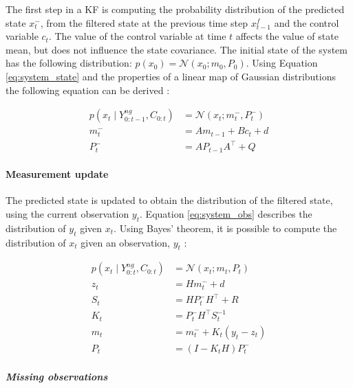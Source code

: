 \documentclass{article}
\newcommand{\norm}[3]{\mathcal{N}\left(#1; #2, #3\right)} %
\begin{document}
The first step in a KF is computing the probability distribution of the predicted state $x^-_t$, from the filtered state at the previous time step $x^f_{t-1}$ and the control variable $c_t$.
The value of the control variable at time $t$ affects the value of state mean, but does not influence the state covariance.
The initial state of the system has the following distribution: $p(x_0) = \norm{x_0}{m_0}{P_0}$. Using Equation \ref{eq:system_state} and the properties of a linear map of Gaussian distributions the following equation can be derived \cite{bishop_pattern_2006, 2020_hennig_pml}:

\begin{equation}
\begin{aligned}\label{eq:time_update}
    p(x_t \mid Y^{ng}_{0:t-1}, C_{0:t}) &= \norm{x_t}{m_t^-}{ P_t^-}\\
    m_t^- &= Am_{t-1} + B c_t + d \\
    P_t^- &= AP_{t-1}A^\top + Q
\end{aligned}
\end{equation}

\paragraph{Measurement update}

The predicted state is updated to obtain the distribution of the filtered state, using the current observation $y_t$. Equation \ref{eq:system_obs} describes the distribution of $y_t$ given $x_t$. Using Bayes' theorem, it is possible to compute the distribution of $x_t$ given an observation, $y_t$ \cite{bishop_pattern_2006, 2020_hennig_pml}:

\begin{equation}
\begin{aligned}
     p(x_t \mid Y^{ng}_{0:t}, C_{0:t}) &= \mathcal{N}(x_t; m_t, P_t) \label{eq:meas_update}\\
     z_t &= Hm_t^- + d \\
     S_t &= HP_t^-H^\top + R \\
     K_t &= P_t^-H^\top S_t^{-1} \\
     m_t &= m_t^- + K_t(y_t - z_t) \\
     P_t &= (I-K_tH)P_t^-
\end{aligned}
\end{equation}

\subparagraph{Missing observations}
\end{document}
